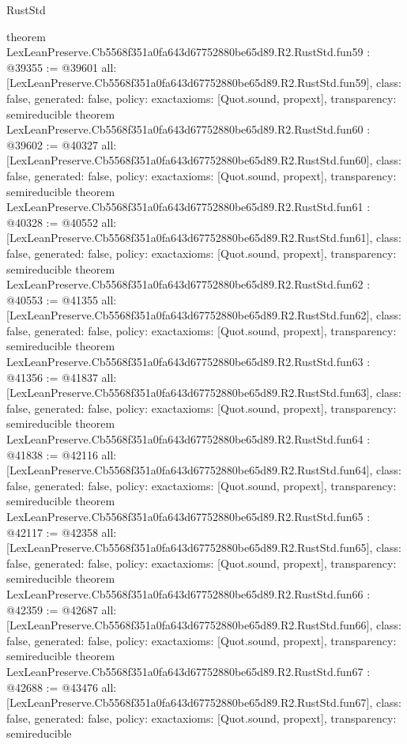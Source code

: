 \begin{lexlean}{RustStd}
\begin{coremodule}
{}
theorem LexLeanPreserve.Cb5568f351a0fa643d67752880be65d89.R2.RustStd.fun59 : @39355 := @39601 {
  all: [LexLeanPreserve.Cb5568f351a0fa643d67752880be65d89.R2.RustStd.fun59],
  class: false,
  generated: false,
  policy: exact{axioms: [Quot.sound, propext]},
  transparency: semireducible
}
theorem LexLeanPreserve.Cb5568f351a0fa643d67752880be65d89.R2.RustStd.fun60 : @39602 := @40327 {
  all: [LexLeanPreserve.Cb5568f351a0fa643d67752880be65d89.R2.RustStd.fun60],
  class: false,
  generated: false,
  policy: exact{axioms: [Quot.sound, propext]},
  transparency: semireducible
}
theorem LexLeanPreserve.Cb5568f351a0fa643d67752880be65d89.R2.RustStd.fun61 : @40328 := @40552 {
  all: [LexLeanPreserve.Cb5568f351a0fa643d67752880be65d89.R2.RustStd.fun61],
  class: false,
  generated: false,
  policy: exact{axioms: [Quot.sound, propext]},
  transparency: semireducible
}
theorem LexLeanPreserve.Cb5568f351a0fa643d67752880be65d89.R2.RustStd.fun62 : @40553 := @41355 {
  all: [LexLeanPreserve.Cb5568f351a0fa643d67752880be65d89.R2.RustStd.fun62],
  class: false,
  generated: false,
  policy: exact{axioms: [Quot.sound, propext]},
  transparency: semireducible
}
theorem LexLeanPreserve.Cb5568f351a0fa643d67752880be65d89.R2.RustStd.fun63 : @41356 := @41837 {
  all: [LexLeanPreserve.Cb5568f351a0fa643d67752880be65d89.R2.RustStd.fun63],
  class: false,
  generated: false,
  policy: exact{axioms: [Quot.sound, propext]},
  transparency: semireducible
}
theorem LexLeanPreserve.Cb5568f351a0fa643d67752880be65d89.R2.RustStd.fun64 : @41838 := @42116 {
  all: [LexLeanPreserve.Cb5568f351a0fa643d67752880be65d89.R2.RustStd.fun64],
  class: false,
  generated: false,
  policy: exact{axioms: [Quot.sound, propext]},
  transparency: semireducible
}
theorem LexLeanPreserve.Cb5568f351a0fa643d67752880be65d89.R2.RustStd.fun65 : @42117 := @42358 {
  all: [LexLeanPreserve.Cb5568f351a0fa643d67752880be65d89.R2.RustStd.fun65],
  class: false,
  generated: false,
  policy: exact{axioms: [Quot.sound, propext]},
  transparency: semireducible
}
theorem LexLeanPreserve.Cb5568f351a0fa643d67752880be65d89.R2.RustStd.fun66 : @42359 := @42687 {
  all: [LexLeanPreserve.Cb5568f351a0fa643d67752880be65d89.R2.RustStd.fun66],
  class: false,
  generated: false,
  policy: exact{axioms: [Quot.sound, propext]},
  transparency: semireducible
}
theorem LexLeanPreserve.Cb5568f351a0fa643d67752880be65d89.R2.RustStd.fun67 : @42688 := @43476 {
  all: [LexLeanPreserve.Cb5568f351a0fa643d67752880be65d89.R2.RustStd.fun67],
  class: false,
  generated: false,
  policy: exact{axioms: [Quot.sound, propext]},
  transparency: semireducible
}
\end{coremodule}
\end{lexlean}
